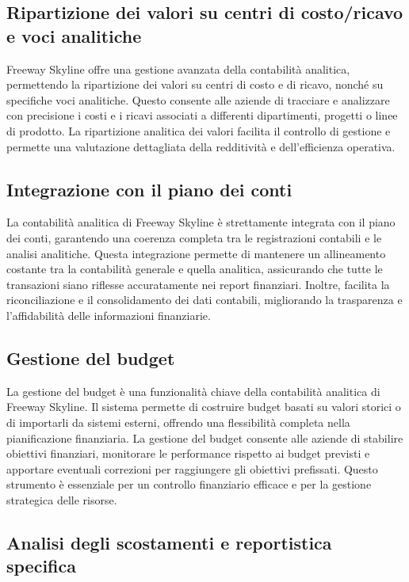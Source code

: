 \documentclass{article}
\begin{document}
\subsection{Ripartizione dei valori su centri di costo/ricavo e voci analitiche}

Freeway Skyline offre una gestione avanzata della contabilità analitica, permettendo la ripartizione dei valori su centri di costo e di ricavo, nonché su specifiche voci analitiche. Questo consente alle aziende di tracciare e analizzare con precisione i costi e i ricavi associati a differenti dipartimenti, progetti o linee di prodotto. La ripartizione analitica dei valori facilita il controllo di gestione e permette una valutazione dettagliata della redditività e dell'efficienza operativa.

\subsection{Integrazione con il piano dei conti}

La contabilità analitica di Freeway Skyline è strettamente integrata con il piano dei conti, garantendo una coerenza completa tra le registrazioni contabili e le analisi analitiche. Questa integrazione permette di mantenere un allineamento costante tra la contabilità generale e quella analitica, assicurando che tutte le transazioni siano riflesse accuratamente nei report finanziari. Inoltre, facilita la riconciliazione e il consolidamento dei dati contabili, migliorando la trasparenza e l'affidabilità delle informazioni finanziarie.

\subsection{Gestione del budget}

La gestione del budget è una funzionalità chiave della contabilità analitica di Freeway Skyline. Il sistema permette di costruire budget basati su valori storici o di importarli da sistemi esterni, offrendo una flessibilità completa nella pianificazione finanziaria. La gestione del budget consente alle aziende di stabilire obiettivi finanziari, monitorare le performance rispetto ai budget previsti e apportare eventuali correzioni per raggiungere gli obiettivi prefissati. Questo strumento è essenziale per un controllo finanziario efficace e per la gestione strategica delle risorse.

\subsection{Analisi degli scostamenti e reportistica specifica}
\end{document}
